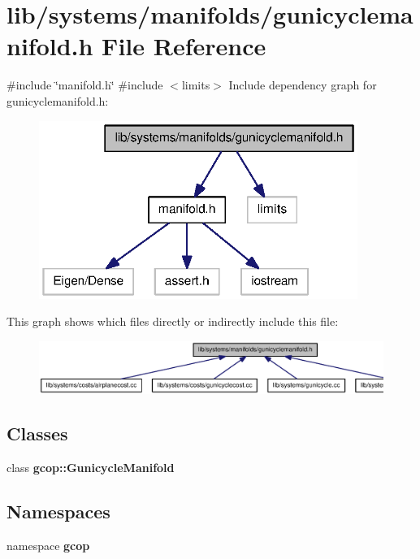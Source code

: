 \section{lib/systems/manifolds/gunicyclemanifold.h \-File \-Reference}
\label{gunicyclemanifold_8h}
{\ttfamily \#include \char`\"{}manifold.\-h\char`\"{}}\*
{\ttfamily \#include $<$limits$>$}\*
\-Include dependency graph for gunicyclemanifold.\-h\-:\nopagebreak
\begin{figure}[H]
\begin{center}
\leavevmode
\includegraphics[width=294pt]{gunicyclemanifold_8h__incl}
\end{center}
\end{figure}
\-This graph shows which files directly or indirectly include this file\-:\nopagebreak
\begin{figure}[H]
\begin{center}
\leavevmode
\includegraphics[width=350pt]{gunicyclemanifold_8h__dep__incl}
\end{center}
\end{figure}
\subsection*{\-Classes}
\begin{DoxyCompactItemize}
\item 
class {\bf gcop\-::\-Gunicycle\-Manifold}
\end{DoxyCompactItemize}
\subsection*{\-Namespaces}
\begin{DoxyCompactItemize}
\item 
namespace {\bf gcop}
\end{DoxyCompactItemize}
